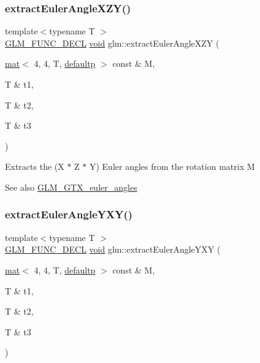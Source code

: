 \subsubsection{\texorpdfstring{extract\+Euler\+Angle\+X\+Z\+Y()}{extractEulerAngleXZY()}}
{\footnotesize\ttfamily template$<$typename T $>$ \\
\mbox{\hyperlink{setup_8hpp_ab2d052de21a70539923e9bcbf6e83a51}{G\+L\+M\+\_\+\+F\+U\+N\+C\+\_\+\+D\+E\+CL}} \mbox{\hyperlink{_s_d_l__opengles2__gl2ext_8h_ae5d8fa23ad07c48bb609509eae494c95}{void}} glm\+::extract\+Euler\+Angle\+X\+ZY (\begin{DoxyParamCaption}\item[{\mbox{\hyperlink{structglm_1_1mat}{mat}}$<$ 4, 4, T, \mbox{\hyperlink{namespaceglm_a36ed105b07c7746804d7fdc7cc90ff25a9d21ccd8b5a009ec7eb7677befc3bf51}{defaultp}} $>$ const \&}]{M,  }\item[{T \&}]{t1,  }\item[{T \&}]{t2,  }\item[{T \&}]{t3 }\end{DoxyParamCaption})}

Extracts the (X $\ast$ Z $\ast$ Y) Euler angles from the rotation matrix M \begin{DoxySeeAlso}{See also}
\mbox{\hyperlink{group__gtx__euler__angles}{G\+L\+M\+\_\+\+G\+T\+X\+\_\+euler\+\_\+angles}} 
\end{DoxySeeAlso}
\mbox{\label{group__gtx__euler__angles_gaab8868556361a190db94374e9983ed39}} 
\subsubsection{\texorpdfstring{extract\+Euler\+Angle\+Y\+X\+Y()}{extractEulerAngleYXY()}}
{\footnotesize\ttfamily template$<$typename T $>$ \\
\mbox{\hyperlink{setup_8hpp_ab2d052de21a70539923e9bcbf6e83a51}{G\+L\+M\+\_\+\+F\+U\+N\+C\+\_\+\+D\+E\+CL}} \mbox{\hyperlink{_s_d_l__opengles2__gl2ext_8h_ae5d8fa23ad07c48bb609509eae494c95}{void}} glm\+::extract\+Euler\+Angle\+Y\+XY (\begin{DoxyParamCaption}\item[{\mbox{\hyperlink{structglm_1_1mat}{mat}}$<$ 4, 4, T, \mbox{\hyperlink{namespaceglm_a36ed105b07c7746804d7fdc7cc90ff25a9d21ccd8b5a009ec7eb7677befc3bf51}{defaultp}} $>$ const \&}]{M,  }\item[{T \&}]{t1,  }\item[{T \&}]{t2,  }\item[{T \&}]{t3 }\end{DoxyParamCaption})}

